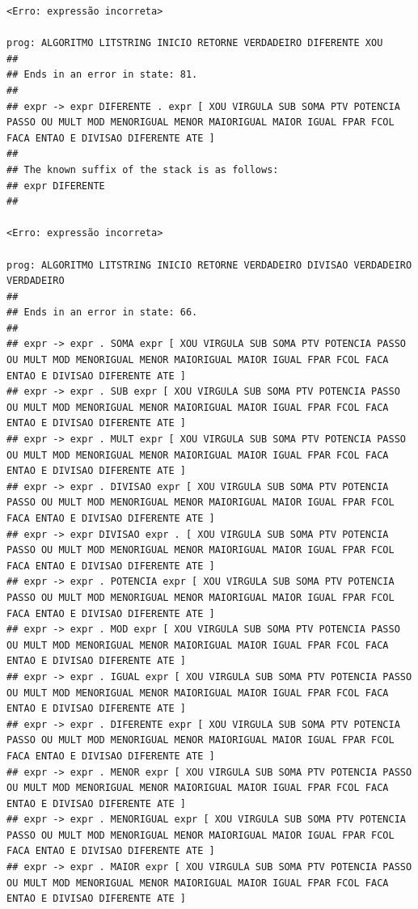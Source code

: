 \documentclass[hidelinks,12pt]{article}
\begin{document}
\begin{lstlisting}
<Erro: expressão incorreta>

prog: ALGORITMO LITSTRING INICIO RETORNE VERDADEIRO DIFERENTE XOU 
##
## Ends in an error in state: 81.
##
## expr -> expr DIFERENTE . expr [ XOU VIRGULA SUB SOMA PTV POTENCIA PASSO OU MULT MOD MENORIGUAL MENOR MAIORIGUAL MAIOR IGUAL FPAR FCOL FACA ENTAO E DIVISAO DIFERENTE ATE ]
##
## The known suffix of the stack is as follows:
## expr DIFERENTE 
##

<Erro: expressão incorreta>

prog: ALGORITMO LITSTRING INICIO RETORNE VERDADEIRO DIVISAO VERDADEIRO VERDADEIRO 
##
## Ends in an error in state: 66.
##
## expr -> expr . SOMA expr [ XOU VIRGULA SUB SOMA PTV POTENCIA PASSO OU MULT MOD MENORIGUAL MENOR MAIORIGUAL MAIOR IGUAL FPAR FCOL FACA ENTAO E DIVISAO DIFERENTE ATE ]
## expr -> expr . SUB expr [ XOU VIRGULA SUB SOMA PTV POTENCIA PASSO OU MULT MOD MENORIGUAL MENOR MAIORIGUAL MAIOR IGUAL FPAR FCOL FACA ENTAO E DIVISAO DIFERENTE ATE ]
## expr -> expr . MULT expr [ XOU VIRGULA SUB SOMA PTV POTENCIA PASSO OU MULT MOD MENORIGUAL MENOR MAIORIGUAL MAIOR IGUAL FPAR FCOL FACA ENTAO E DIVISAO DIFERENTE ATE ]
## expr -> expr . DIVISAO expr [ XOU VIRGULA SUB SOMA PTV POTENCIA PASSO OU MULT MOD MENORIGUAL MENOR MAIORIGUAL MAIOR IGUAL FPAR FCOL FACA ENTAO E DIVISAO DIFERENTE ATE ]
## expr -> expr DIVISAO expr . [ XOU VIRGULA SUB SOMA PTV POTENCIA PASSO OU MULT MOD MENORIGUAL MENOR MAIORIGUAL MAIOR IGUAL FPAR FCOL FACA ENTAO E DIVISAO DIFERENTE ATE ]
## expr -> expr . POTENCIA expr [ XOU VIRGULA SUB SOMA PTV POTENCIA PASSO OU MULT MOD MENORIGUAL MENOR MAIORIGUAL MAIOR IGUAL FPAR FCOL FACA ENTAO E DIVISAO DIFERENTE ATE ]
## expr -> expr . MOD expr [ XOU VIRGULA SUB SOMA PTV POTENCIA PASSO OU MULT MOD MENORIGUAL MENOR MAIORIGUAL MAIOR IGUAL FPAR FCOL FACA ENTAO E DIVISAO DIFERENTE ATE ]
## expr -> expr . IGUAL expr [ XOU VIRGULA SUB SOMA PTV POTENCIA PASSO OU MULT MOD MENORIGUAL MENOR MAIORIGUAL MAIOR IGUAL FPAR FCOL FACA ENTAO E DIVISAO DIFERENTE ATE ]
## expr -> expr . DIFERENTE expr [ XOU VIRGULA SUB SOMA PTV POTENCIA PASSO OU MULT MOD MENORIGUAL MENOR MAIORIGUAL MAIOR IGUAL FPAR FCOL FACA ENTAO E DIVISAO DIFERENTE ATE ]
## expr -> expr . MENOR expr [ XOU VIRGULA SUB SOMA PTV POTENCIA PASSO OU MULT MOD MENORIGUAL MENOR MAIORIGUAL MAIOR IGUAL FPAR FCOL FACA ENTAO E DIVISAO DIFERENTE ATE ]
## expr -> expr . MENORIGUAL expr [ XOU VIRGULA SUB SOMA PTV POTENCIA PASSO OU MULT MOD MENORIGUAL MENOR MAIORIGUAL MAIOR IGUAL FPAR FCOL FACA ENTAO E DIVISAO DIFERENTE ATE ]
## expr -> expr . MAIOR expr [ XOU VIRGULA SUB SOMA PTV POTENCIA PASSO OU MULT MOD MENORIGUAL MENOR MAIORIGUAL MAIOR IGUAL FPAR FCOL FACA ENTAO E DIVISAO DIFERENTE ATE ]

\end{lstlisting}
\end{document}
